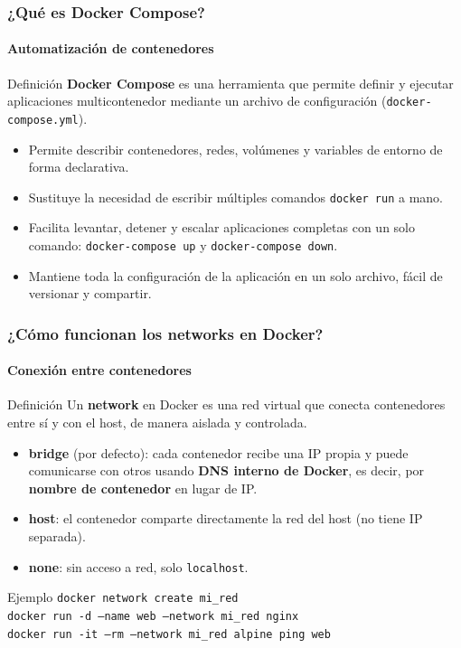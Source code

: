 
\begin{frame}
    \frametitle{¿Qué es Docker Compose?}
    \framesubtitle{Automatización de contenedores}

    \begin{block}{Definición}
        \textbf{Docker Compose} es una herramienta que permite definir y ejecutar 
        aplicaciones multicontenedor mediante un archivo de configuración (\texttt{docker-compose.yml}).
    \end{block}

    \begin{itemize}
        \item Permite describir contenedores, redes, volúmenes y variables de entorno de forma declarativa.
        \item Sustituye la necesidad de escribir múltiples comandos \texttt{docker run} a mano.
        \item Facilita levantar, detener y escalar aplicaciones completas con un solo comando:
              \texttt{docker-compose up} y \texttt{docker-compose down}.
        \item Mantiene toda la configuración de la aplicación en un solo archivo, fácil de versionar y compartir.
    \end{itemize}
\end{frame}


\begin{frame}
    \frametitle{¿Cómo funcionan los networks en Docker?}
    \framesubtitle{Conexión entre contenedores}

    \begin{block}{Definición}
        Un \textbf{network} en Docker es una red virtual que conecta contenedores 
        entre sí y con el host, de manera aislada y controlada.
    \end{block}

    \begin{itemize}
        \item \textbf{bridge} (por defecto): cada contenedor recibe una IP propia 
              y puede comunicarse con otros usando \textbf{DNS interno de Docker}, 
              es decir, por \textbf{nombre de contenedor} en lugar de IP.
        \item \textbf{host}: el contenedor comparte directamente la red del host 
              (no tiene IP separada).
        \item \textbf{none}: sin acceso a red, solo \texttt{localhost}.
    \end{itemize}

    \pause
    \begin{block}{Ejemplo}
        \texttt{docker network create mi\_red} \\
        \texttt{docker run -d --name web --network mi\_red nginx} \\
        \texttt{docker run -it --rm --network mi\_red alpine ping web}
    \end{block}
\end{frame}

